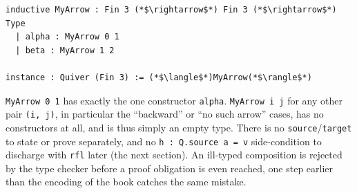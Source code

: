 \begin{lstlisting}
inductive MyArrow : Fin 3 (*$\rightarrow$*) Fin 3 (*$\rightarrow$*) Type
  | alpha : MyArrow 0 1
  | beta : MyArrow 1 2

instance : Quiver (Fin 3) := (*$\langle$*)MyArrow(*$\rangle$*)
\end{lstlisting}

\texttt{MyArrow 0 1} has exactly the one constructor \texttt{alpha}. \texttt{MyArrow i j} for any other pair \texttt{(i, j)}, in particular the ``backward'' or ``no such arrow'' cases, has no constructors at all, and is thus simply an empty type. There is no \texttt{source}/\texttt{target} to state or prove separately, and no \texttt{h : Q.source a = v} side-condition to discharge with \texttt{rfl} later (the next section). An ill-typed composition is rejected by the type checker before a proof obligation is even reached, one step earlier than the encoding of the book catches the same mistake.
